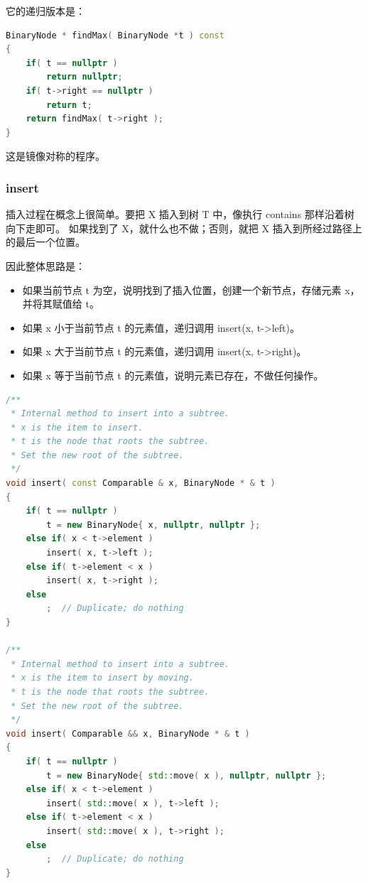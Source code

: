 \documentclass[a4paper]{ctexart}
\theoremstyle{definition}
\theoremstyle{definition}
\begin{document}
它的递归版本是：
\begin{lstlisting}[language=C++]
BinaryNode * findMax( BinaryNode *t ) const
{
    if( t == nullptr )
        return nullptr;
    if( t->right == nullptr )
        return t;
    return findMax( t->right );
}
\end{lstlisting}

这是镜像对称的程序。

\subsubsection*{insert}

插入过程在概念上很简单。要把 X 插入到树 T 中，像执行 contains 那样沿着树向下走即可。
如果找到了 X，就什么也不做；否则，就把 X 插入到所经过路径上的最后一个位置。

因此整体思路是：
\begin{itemize}
\item 如果当前节点 t 为空，说明找到了插入位置，创建一个新节点，存储元素 x，并将其赋值给 t。
\item 如果 x 小于当前节点 t 的元素值，递归调用 insert(x, t->left)。
\item 如果 x 大于当前节点 t 的元素值，递归调用 insert(x, t->right)。
\item 如果 x 等于当前节点 t 的元素值，说明元素已存在，不做任何操作。
\end{itemize}

\begin{lstlisting}[language=C++]
/**
 * Internal method to insert into a subtree.
 * x is the item to insert.
 * t is the node that roots the subtree.
 * Set the new root of the subtree.
 */
void insert( const Comparable & x, BinaryNode * & t )
{
    if( t == nullptr )
        t = new BinaryNode{ x, nullptr, nullptr };
    else if( x < t->element )
        insert( x, t->left );
    else if( t->element < x )
        insert( x, t->right );
    else
        ;  // Duplicate; do nothing
}

/**
 * Internal method to insert into a subtree.
 * x is the item to insert by moving.
 * t is the node that roots the subtree.
 * Set the new root of the subtree.
 */
void insert( Comparable && x, BinaryNode * & t )
{
    if( t == nullptr )
        t = new BinaryNode{ std::move( x ), nullptr, nullptr };
    else if( x < t->element )
        insert( std::move( x ), t->left );
    else if( t->element < x )
        insert( std::move( x ), t->right );
    else
        ;  // Duplicate; do nothing
}
\end{lstlisting}
\end{document}
